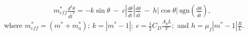 \documentclass{jfm}
\begin{document}
\begin{align}
m_{eff}^* \frac{d^2 \theta}{d\tilde{t}^2}= - k \sin{\theta} \ - \ c \left| \frac{d \theta}{d \tilde{t}}\right| \frac{d \theta}{d \tilde{t}} \ - \ h \left | \cos{\theta} \right | \ \text{sgn} \left( \frac{d \theta} {d\tilde{t}} \right)
\label{EqtofMotion},
\end{align}
where $m_{eff}^* = (m^* + m^*_a); \ k = \left |m^* - 1 \right |; \ c = \frac{1}{2} C_D \frac{A_p L}{\mathcal{V}};$  and $h = \mu_f\left| m^* -1 \right| \frac{R}{L}$.\\


\end{document}
